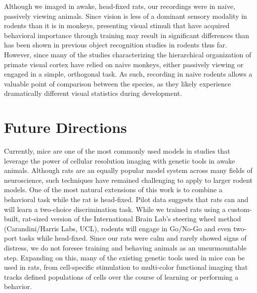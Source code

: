 Although we imaged in awake, head-fixed rats, our recordings were in naive, passively viewing animals. Since vision is less of a dominant sensory modality in rodents than it is in monkeys, presenting visual stimuli that have acquired behavioral importance through training may result in significant differences than has been shown in previous object recognition studies in rodents thus far. However, since many of the studies characterizing the hierarchical organization of primate visual cortex have relied on naive monkeys, either passively viewing or engaged in a simple, orthogonal task. As such, recording in naive rodents allows a valuable point of comparison between the species, as they likely experience dramatically different visual statistics during development.


\section{Future Directions}
Currently, mice are one of the most commonly used models in studies that leverage the power of cellular resolution imaging with genetic tools in awake animals. Although rats are an equally popular model system across many fields of neuroscience, such techniques have remained challenging to apply to larger rodent models. One of the most natural extensions of this work is to combine a behavioral task while the rat is head-fixed. Pilot data suggests that rats can and will learn a two-choice discrimination task. While we trained rats using a custom-built, rat-sized version of the International Brain Lab's steering wheel method (Carandini/Harris Labs, UCL), rodents will engage in Go/No-Go and even two-port tasks while head-fixed. Since our rats were calm and rarely showed signs of distress, we do not foresee training and behaving animals as an unsurmountable step. Expanding on this, many of the existing genetic tools used in mice can be used in rats, from cell-specific stimulation to multi-color functional imaging that tracks defined populations of cells over the course of learning or performing a behavior. 

